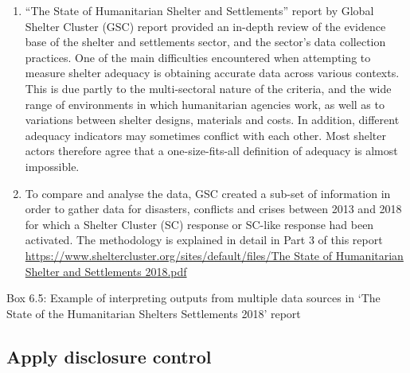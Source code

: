 \documentclass[
]{article}
\begin{document}
\begin{enumerate}
\def\labelenumi{\arabic{enumi}.}
\setcounter{enumi}{474}
\item
  ``The State of Humanitarian Shelter and Settlements'' report by
  Global Shelter Cluster (GSC) report provided an in-depth review of
  the evidence base of the shelter and settlements sector, and the
  sector's data collection practices. One of the main difficulties
  encountered when attempting to measure shelter adequacy is obtaining
  accurate data across various contexts. This is due partly to the
  multi-sectoral nature of the criteria, and the wide range of
  environments in which humanitarian agencies work, as well as to
  variations between shelter designs, materials and costs. In
  addition, different adequacy indicators may sometimes conflict with
  each other. Most shelter actors therefore agree that a
  one-size-fits-all definition of adequacy is almost impossible.
\item
  To compare and analyse the data, GSC created a sub-set of
  information in order to gather data for disasters, conflicts and
  crises between 2013 and 2018 for which a Shelter Cluster (SC)
  response or SC-like response had been activated. The methodology is
  explained in detail in Part 3 of this report
  \href{https://www.sheltercluster.org/sites/default/files/The\%20State\%20of\%20Humanitarian\%20Shelter\%20and\%20Settlements\%202018.pdf}{https://www.sheltercluster.org/sites/default/files/The State of
  Humanitarian Shelter and Settlements
  2018.pdf}
\end{enumerate}

Box 6.5: Example of interpreting outputs from multiple data sources in
`The State of the Humanitarian Shelters Settlements 2018' report

\hypertarget{apply-disclosure-control-1}{%
\subsection{Apply disclosure control}\label{apply-disclosure-control-1}}
\end{document}
